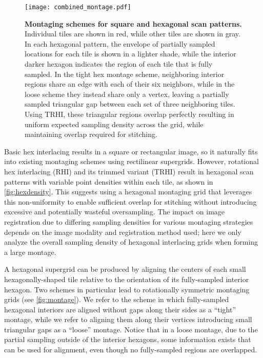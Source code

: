 \documentclass[aip, amsmath, amssymb, nobibnotes, nofootinbib, citeautoscript, reprint, superscriptaddress]{revtex4-2}
\begin{document}
    \begin{figure*}
        \texttt{[image: combined\_montage.pdf]}
        \caption{
            \label{fig:montage}\textbf{Montaging schemes for square and hexagonal scan patterns.}
            Individual tiles are shown in red, while other tiles are shown in gray.
            In each hexagonal pattern, the envelope of partially sampled locations for each tile is shown in a lighter shade, while the interior darker hexagon indicates the region of each tile that is fully sampled.
            In the tight hex montage scheme, neighboring interior regions share an edge with each of their six neighbors, while in the loose scheme they instead share only a vertex, leaving a partially sampled triangular gap between each set of three neighboring tiles.
            Using TRHI, these triangular regions overlap perfectly resulting in uniform expected sampling density across the grid, while maintaining overlap required for stitching.
            }
    \end{figure*}

    Basic hex interlacing results in a square or rectangular image, so it naturally fits into existing montaging schemes using rectilinear supergrids.
    However, rotational hex interlacing (RHI) and its trimmed variant (TRHI) result in hexagonal scan patterns with variable point densities within each tile, as shown in \autoref{fig:hexdensity}.
    This suggests using a hexagonal montaging grid that leverages this non-uniformity to enable sufficient overlap for stitching without introducing excessive and potentially wasteful oversampling.
    The impact on image registration due to differing sampling densities for various montaging strategies depends on the image modality and registration method used; here we only analyze the overall sampling density of hexagonal interlacing grids when forming a large montage.


    A hexagonal supergrid can be produced by aligning the centers of each small hexagonally-shaped tile relative to the orientation of its fully-sampled interior hexagon.
    Two schemes in particular lead to rotationally symmetric montaging grids (see \autoref{fig:montage}).
    We refer to the scheme in which fully-sampled hexagonal interiors are aligned without gaps along their sides as a ``tight'' montage, while we refer to aligning them along their vertices introducing small triangular gaps as a ``loose'' montage.
    Notice that in a loose montage, due to the partial sampling outside of the interior hexagons, some information exists that can be used for alignment, even though no fully-sampled regions are overlapped.
\end{document}
